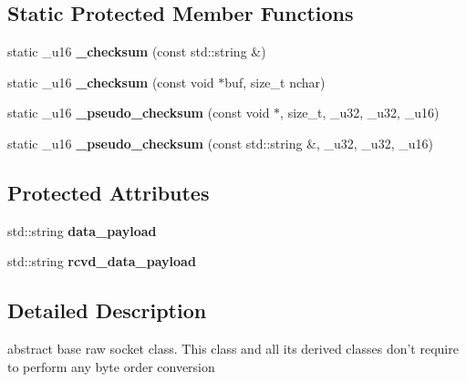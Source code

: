 \subsection*{Static Protected Member Functions}
\begin{CompactItemize}
\item 
\hypertarget{classsocketpp_1_1RawSocket_e114c1e1636e95760336713f33b9b2c5}{
static \_\-u16 \textbf{\_\-checksum} (const std::string \&)}
\label{classsocketpp_1_1RawSocket_e114c1e1636e95760336713f33b9b2c5}

\item 
\hypertarget{classsocketpp_1_1RawSocket_a6e38eab5a27b4bda8c6d2f6932b6543}{
static \_\-u16 \textbf{\_\-checksum} (const void $\ast$buf, size\_\-t nchar)}
\label{classsocketpp_1_1RawSocket_a6e38eab5a27b4bda8c6d2f6932b6543}

\item 
\hypertarget{classsocketpp_1_1RawSocket_36370cd40b54b68470f30a9e9c265d1f}{
static \_\-u16 \textbf{\_\-pseudo\_\-checksum} (const void $\ast$, size\_\-t, \_\-u32, \_\-u32, \_\-u16)}
\label{classsocketpp_1_1RawSocket_36370cd40b54b68470f30a9e9c265d1f}

\item 
\hypertarget{classsocketpp_1_1RawSocket_6b881ff5a36ad69629cf6eabad5b1a33}{
static \_\-u16 \textbf{\_\-pseudo\_\-checksum} (const std::string \&, \_\-u32, \_\-u32, \_\-u16)}
\label{classsocketpp_1_1RawSocket_6b881ff5a36ad69629cf6eabad5b1a33}

\end{CompactItemize}
\subsection*{Protected Attributes}
\begin{CompactItemize}
\item 
\hypertarget{classsocketpp_1_1RawSocket_4d3a1236c4ac42ab029323ae14586ff8}{
std::string \textbf{data\_\-payload}}
\label{classsocketpp_1_1RawSocket_4d3a1236c4ac42ab029323ae14586ff8}

\item 
\hypertarget{classsocketpp_1_1RawSocket_3e166c1c401c30b5721dc54f93772b36}{
std::string \textbf{rcvd\_\-data\_\-payload}}
\label{classsocketpp_1_1RawSocket_3e166c1c401c30b5721dc54f93772b36}

\end{CompactItemize}


\subsection{Detailed Description}
abstract base raw socket class. This class and all its derived classes don't require to perform any byte order conversion 

